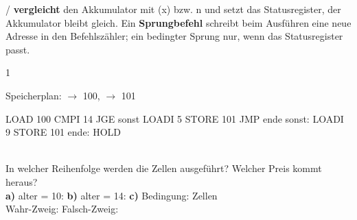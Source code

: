 \documentclass[11pt,a4paper]{article}
\begin{document}

 /  \textbf{vergleicht} den Akkumulator mit (x) bzw. n und setzt das Statusregister, der Akkumulator bleibt gleich.
Ein \textbf{Sprungbefehl} schreibt beim Ausführen eine neue Adresse in den Befehlszähler; ein bedingter Sprung nur, wenn das Statusregister passt.

\begin{aufgabe}{1}
\begin{minipage}[t]{0.42\linewidth}
\vspace{0pt}
{\small Speicherplan:  $\to$ 100,  $\to$ 101}
\begin{asm}[aboveskip=1mm]
       LOAD 100
       CMPI 14
       JGE sonst
       LOADI 5
       STORE 101
       JMP ende
sonst: LOADI 9
       STORE 101
ende:  HOLD
\end{asm}
\end{minipage}\hfill
\begin{minipage}[t]{0.54\linewidth}
\vspace{1mm}
\\[1mm]
\lueckentext
In welcher Reihenfolge werden die Zellen ausgeführt? Welcher Preis kommt heraus?\\
\textbf{a)} alter = 10: 
\textbf{b)} alter = 14: 
\textbf{c)} Bedingung: Zellen \\
Wahr-Zweig:  Falsch-Zweig: 
\end{minipage}
\end{aufgabe}
\end{document}
